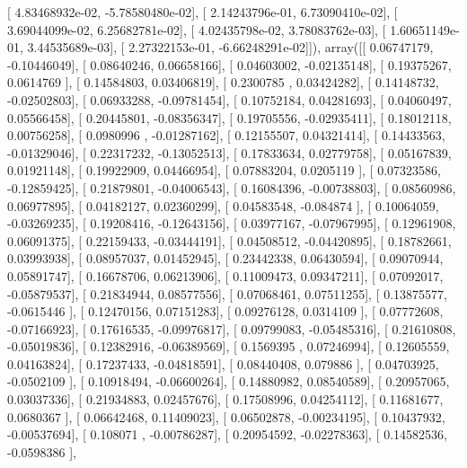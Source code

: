 \documentclass{article}
\begin{document}
       [  4.83468932e-02,  -5.78580480e-02],
       [  2.14243796e-01,   6.73090410e-02],
       [  3.69044099e-02,   6.25682781e-02],
       [  4.02435798e-02,   3.78083762e-03],
       [  1.60651149e-01,   3.44535689e-03],
       [  2.27322153e-01,  -6.66248291e-02]]), array([[ 0.06747179, -0.10446049],
       [ 0.08640246,  0.06658166],
       [ 0.04603002, -0.02135148],
       [ 0.19375267,  0.0614769 ],
       [ 0.14584803,  0.03406819],
       [ 0.2300785 ,  0.03424282],
       [ 0.14148732, -0.02502803],
       [ 0.06933288, -0.09781454],
       [ 0.10752184,  0.04281693],
       [ 0.04060497,  0.05566458],
       [ 0.20445801, -0.08356347],
       [ 0.19705556, -0.02935411],
       [ 0.18012118,  0.00756258],
       [ 0.0980996 , -0.01287162],
       [ 0.12155507,  0.04321414],
       [ 0.14433563, -0.01329046],
       [ 0.22317232, -0.13052513],
       [ 0.17833634,  0.02779758],
       [ 0.05167839,  0.01921148],
       [ 0.19922909,  0.04466954],
       [ 0.07883204,  0.0205119 ],
       [ 0.07323586, -0.12859425],
       [ 0.21879801, -0.04006543],
       [ 0.16084396, -0.00738803],
       [ 0.08560986,  0.06977895],
       [ 0.04182127,  0.02360299],
       [ 0.04583548, -0.084874  ],
       [ 0.10064059, -0.03269235],
       [ 0.19208416, -0.12643156],
       [ 0.03977167, -0.07967995],
       [ 0.12961908,  0.06091375],
       [ 0.22159433, -0.03444191],
       [ 0.04508512, -0.04420895],
       [ 0.18782661,  0.03993938],
       [ 0.08957037,  0.01452945],
       [ 0.23442338,  0.06430594],
       [ 0.09070944,  0.05891747],
       [ 0.16678706,  0.06213906],
       [ 0.11009473,  0.09347211],
       [ 0.07092017, -0.05879537],
       [ 0.21834944,  0.08577556],
       [ 0.07068461,  0.07511255],
       [ 0.13875577, -0.0615446 ],
       [ 0.12470156,  0.07151283],
       [ 0.09276128,  0.0314109 ],
       [ 0.07772608, -0.07166923],
       [ 0.17616535, -0.09976817],
       [ 0.09799083, -0.05485316],
       [ 0.21610808, -0.05019836],
       [ 0.12382916, -0.06389569],
       [ 0.1569395 ,  0.07246994],
       [ 0.12605559,  0.04163824],
       [ 0.17237433, -0.04818591],
       [ 0.08440408,  0.079886  ],
       [ 0.04703925, -0.0502109 ],
       [ 0.10918494, -0.06600264],
       [ 0.14880982,  0.08540589],
       [ 0.20957065,  0.03037336],
       [ 0.21934883,  0.02457676],
       [ 0.17508996,  0.04254112],
       [ 0.11681677,  0.0680367 ],
       [ 0.06642468,  0.11409023],
       [ 0.06502878, -0.00234195],
       [ 0.10437932, -0.00537694],
       [ 0.108071  , -0.00786287],
       [ 0.20954592, -0.02278363],
       [ 0.14582536, -0.0598386 ],
\end{document}
